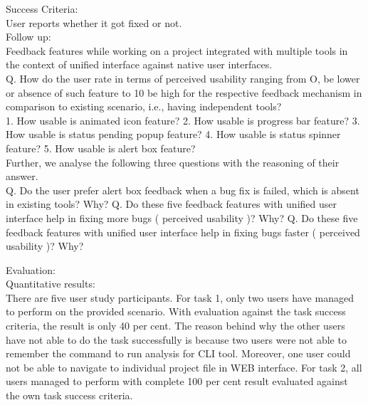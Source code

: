 Success Criteria: \\

User reports whether it got fixed or not. \\

Follow up: \\

Feedback features while working on a project integrated with multiple tools in the context of unified interface against native user interfaces. \\

Q. How do the user rate in terms of perceived usability ranging from O, be lower or absence of such feature to 10 be high for the respective feedback mechanism in comparison to existing scenario, i.e., having independent tools? \\

1. How usable is animated icon feature? 
2. How usable is progress bar feature? 
3. How usable is status pending popup feature? 
4. How usable is status spinner feature? 
5. How usable is alert box feature? \\

Further, we analyse the following three questions with the reasoning of their answer. \\

Q. Do the user prefer alert box feedback when a bug fix is failed, which is absent in existing tools? Why? 
Q. Do these five feedback features with unified user interface help in fixing more bugs ( perceived usability )? Why?
Q. Do these five feedback features with unified user interface help in fixing bugs faster ( perceived usability )? Why?

Evaluation: \\

Quantitative results: \\

There are five user study participants. For task 1, only two users have managed to perform on the provided scenario. With evaluation against the task success criteria, the result is only 40 per cent. The reason behind why the other users have not able to do the task successfully is because two users were not able to remember the command to run analysis for CLI tool. Moreover, one user could not be able to navigate to individual project file in WEB interface. For task 2, all users managed to perform with complete 100 per cent result evaluated against the own task success criteria. \\

